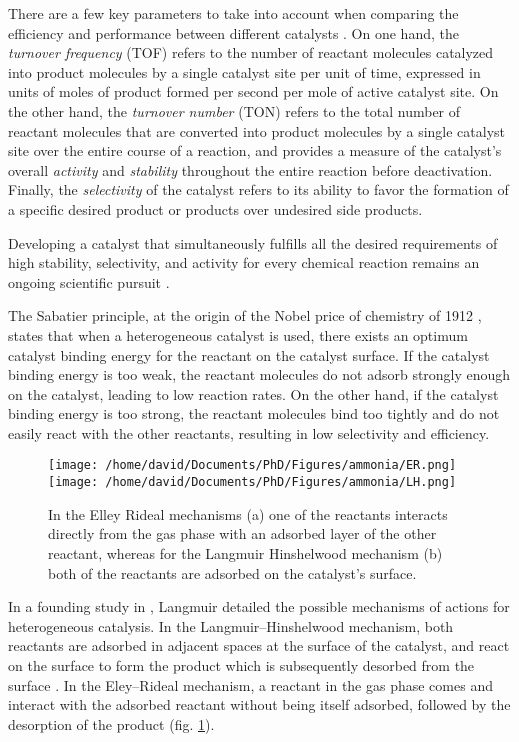 There are a few key parameters to take into account when comparing the efficiency and performance between different catalysts \parencite{Boudart1995, ZHANG2019, WACHS2022}.
On one hand, the \textit{turnover frequency} (TOF) refers to the number of reactant molecules catalyzed into product molecules by a single catalyst site per unit of time, expressed in units of moles of product formed per second per mole of active catalyst site.
On the other hand, the \textit{turnover number} (TON) refers to the total number of reactant molecules that are converted into product molecules by a single catalyst site over the entire course of a reaction, and provides a measure of the catalyst's overall \textit{activity} and \textit{stability} throughout the entire reaction before deactivation.
Finally, the \textit{selectivity} of the catalyst refers to its ability to favor the formation of a specific desired product or products over undesired side products.

Developing a catalyst that simultaneously fulfills all the desired requirements of high stability, selectivity, and activity for every chemical reaction remains an ongoing scientific pursuit \parencite{Hagen2016}.

The Sabatier principle, at the origin of the Nobel price of chemistry of 1912 \parencite{Che2013}, states that when a heterogeneous catalyst is used, there exists an optimum catalyst binding energy for the reactant on the catalyst surface.
If the catalyst binding energy is too weak, the reactant molecules do not adsorb strongly enough on the catalyst, leading to low reaction rates.
On the other hand, if the catalyst binding energy is too strong, the reactant molecules bind too tightly and do not easily react with the other reactants, resulting in low selectivity and efficiency.

\begin{figure}[!htb]
    \centering
    \texttt{[image: /home/david/Documents/PhD/Figures/ammonia/ER.png]}
    \texttt{[image: /home/david/Documents/PhD/Figures/ammonia/LH.png]}
    \caption{
        In the Elley Rideal mechanisms (a) one of the reactants interacts directly from the gas phase with an adsorbed layer of the other reactant, whereas for the Langmuir Hinshelwood mechanism (b) both of the reactants are adsorbed on the catalyst's surface.
    }
    \label{fig:Mechanisms}
\end{figure}

In a founding study in \cite*{Langmuir1922}, Langmuir detailed the possible mechanisms of actions for heterogeneous catalysis.
In the Langmuir–Hinshelwood mechanism, both reactants are adsorbed in adjacent spaces at the surface of the catalyst, and react on the surface to form the product which is subsequently desorbed from the surface \parencite{Prins2018, ROSS2019}.
In the Eley–Rideal mechanism, a reactant in the gas phase comes and interact with the adsorbed reactant without being itself adsorbed, followed by the desorption of the product \parencite{rideal_1939, Weinberg1996}  (fig. \ref{fig:Mechanisms}).


